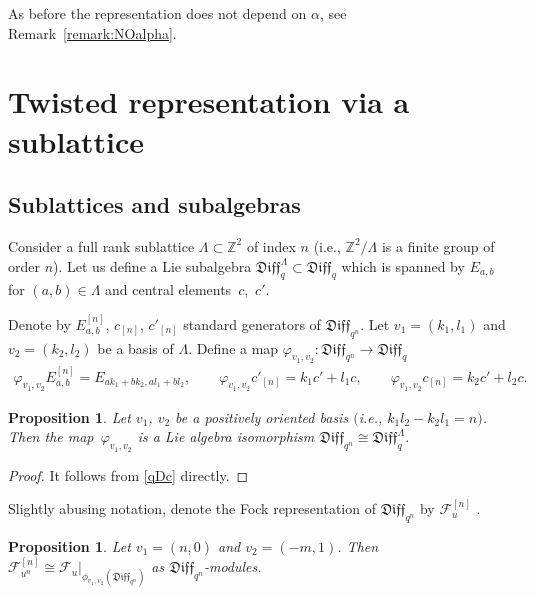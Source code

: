 \documentclass[pdftex]{sigma}
\numberwithin{equation}{section}
\newtheorem{Proposition}[Theorem]{Proposition}
\theoremstyle{definition}
\newcommand{\qd}[1]{ \mathfrak{Diff}_{q^{#1}} }
\newcommand{\qD}{\mathfrak{Diff}_q}
\newcommand{\qDn}{\mathfrak{Diff}_{q^n}}
\begin{document}
As before the representation does not depend on $\alpha$, see Remark~\ref{remark:NOalpha}.

\section{Twisted representation via a sublattice}\label{S:sublattice}

\subsection{Sublattices and subalgebras}

Consider a full rank sublattice $\Lambda \subset \mathbb{Z}^2$ of index $n$ (i.e., $\mathbb{Z}^2/\Lambda$ is a finite group of order $n$). Let us define a Lie subalgebra $\qD^{\Lambda} \subset \qD$ which is spanned by $E_{a,b}$ for $(a,b) \in \Lambda$ and central elements~$c$,~$c'$.

Denote by $E_{a,b}^{[n]}$, $c_{[n]}$, $c'_{[n]}$ standard generators of $\qDn$. Let $v_1 = (k_1, l_1)$ and $v_2 = (k_2, l_2)$ be a basis of $\Lambda$. Define a map $\varphi_{v_1, v_2}\colon \qDn \rightarrow \qD$
\begin{gather*}
\varphi_{v_1, v_2} E^{\scriptstyle{[n]}}_{a,b} = E_{a k_1 + b k_2, a l_1 + b l_2}, \qquad
\varphi_{v_1, v_2} c'_{\scriptstyle{[n]}} = k_1 c' + l_1 c, \qquad
\varphi_{v_1, v_2} c_{\scriptstyle{[n]}} = k_2 c' + l_2 c.
\end{gather*}

\begin{Proposition}
Let $v_1$, $v_2$ be a positively oriented basis $($i.e., $k_1 l_2 - k_2 l_1 =n)$. Then the map~$\varphi_{v_1, v_2}$ is a Lie algebra isomorphism $\qDn \cong \qD^{\Lambda}$.
\end{Proposition}

\begin{proof}It follows from \eqref{qDc} directly.
\end{proof}

Slightly abusing notation, denote the Fock representation of $\qDn$ by $\mathcal{F}_u^{[n]}$ .

\begin{Proposition} \label{LambdaFock}
Let $v_1 = (n,0)$ and $v_2 =(-m, 1)$. Then $ \mathcal{F}_{u^{n}}^{[n]} \cong \left. \mathcal{F}_u \right|_{\phi_{v_1, v_2} \left(\qd{n} \right)}$ as $\qd{n}$-modules.
\end{Proposition}
\end{document}
